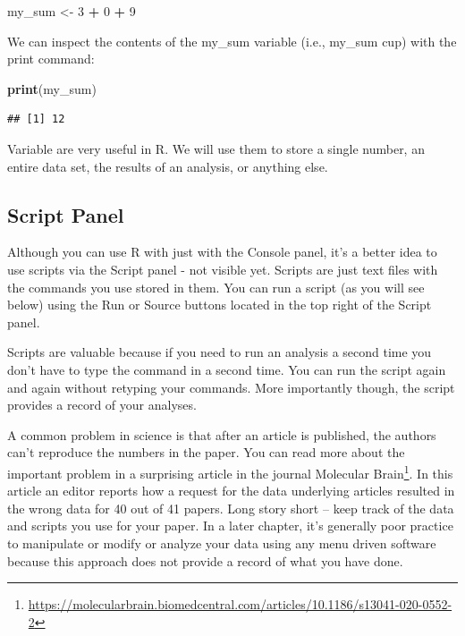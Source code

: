 \documentclass[
]{krantz}
\makeatletter
\newenvironment{Shaded}{\begin{snugshade}}{\end{snugshade}}
\newcommand{\DecValTok}[1]{\textcolor[rgb]{0.06,0.06,0.06}{#1}}
\newcommand{\KeywordTok}[1]{\textcolor[rgb]{0.27,0.27,0.27}{\textbf{#1}}}
\newcommand{\NormalTok}[1]{#1}
\newcommand{\OperatorTok}[1]{\textcolor[rgb]{0.43,0.43,0.43}{\textbf{#1}}}
\newcommand{\StringTok}[1]{\textcolor[rgb]{0.5,0.5,0.5}{#1}}
\renewcommand{\href}[2]{#2\footnote{\url{#1}}}
\newenvironment{kframe}{%
\medskip{}
\setlength{\fboxsep}{.8em}
 \def\at@end@of@kframe{}%
 \ifinner\ifhmode%
  \def\at@end@of@kframe{\end{minipage}}%
  \begin{minipage}{\columnwidth}%
 \fi\fi%
 \def\FrameCommand##1{\hskip\@totalleftmargin \hskip-\fboxsep
 \colorbox{shadecolor}{##1}\hskip-\fboxsep
     \hskip-\linewidth \hskip-\@totalleftmargin \hskip\columnwidth}%
 \MakeFramed {\advance\hsize-\width
   \@totalleftmargin\z@ \linewidth\hsize
   \@setminipage}}%
 {\par\unskip\endMakeFramed%
 \at@end@of@kframe}
\renewenvironment{Shaded}{\begin{kframe}}{\end{kframe}}
\makeatother
\begin{document}
\begin{Shaded}
\begin{Highlighting}[]
\NormalTok{my_sum <-}\StringTok{ }\DecValTok{3} \OperatorTok{+}\StringTok{ }\DecValTok{0} \OperatorTok{+}\StringTok{ }\DecValTok{9}
\end{Highlighting}
\end{Shaded}

We can inspect the contents of the my\_sum variable (i.e., my\_sum cup) with the print command:

\begin{Shaded}
\begin{Highlighting}[]
\KeywordTok{print}\NormalTok{(my_sum)}
\end{Highlighting}
\end{Shaded}

\begin{verbatim}
## [1] 12
\end{verbatim}

Variable are very useful in R. We will use them to store a single number, an entire data set,
the results of an analysis, or anything else.

\hypertarget{script-panel}{%
\subsection{Script Panel}\label{script-panel}}

Although you can use R with just with the Console panel, it's a better idea to use scripts via the Script panel - not visible yet. Scripts are just text files with the commands you use stored in them. You can run a script (as you will see below) using the Run or Source buttons located in the top right of the Script panel.

Scripts are valuable because if you need to run an analysis a second time you don't have to type the command in a second time. You can run the script again and again without retyping your commands. More importantly though, the script provides a record of your analyses.

A common problem in science is that after an article is published, the authors can't reproduce the numbers in the paper. You can read more about the important problem in a surprising article in the journal \href{https://molecularbrain.biomedcentral.com/articles/10.1186/s13041-020-0552-2}{Molecular Brain}. In this article an editor reports how a request for the data underlying articles resulted in the wrong data for 40 out of 41 papers. Long story short -- keep track of the data and scripts you use for your paper. In a later chapter, it's generally poor practice to manipulate or modify or analyze your data using any menu driven software because this approach does not provide a record of what you have done.
\end{document}
